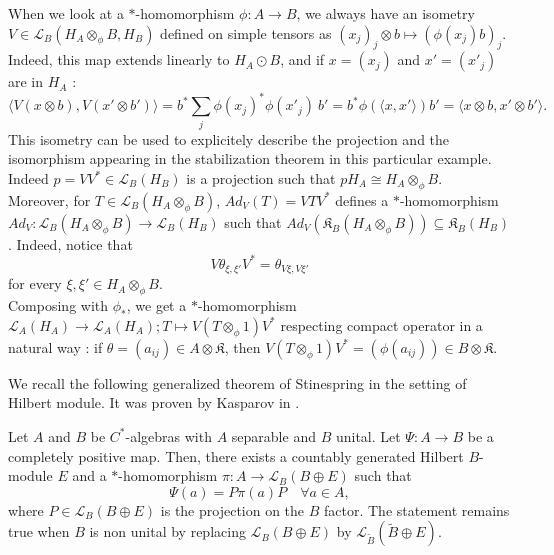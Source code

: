 \begin{rk}\label{isometry}
When we look at a $*$-homomorphism $\phi : A\rightarrow B$, we always have an isometry $V\in \mathcal L_B ( H_A\otimes_\phi B , H_B)$ defined on simple tensors as $(x_j)_j\otimes b \mapsto (\phi(x_j)b)_j$. Indeed, this map extends linearly to $H_A \odot B$, and if $x = (x_j)$ and $x'=(x'_j)$ are in $H_A$ : 
\[\langle V (x\otimes b) , V(x'\otimes b')\rangle = b^* \sum_j \phi(x_j)^* \phi(x'_j) \  b' = b^*\phi(\langle x, x' \rangle)b' = \langle x\otimes b , x'\otimes b' \rangle . \] %
This isometry can be used to explicitely describe the projection and the isomorphism appearing in the stabilization theorem in this particular example. Indeed $p = VV^*\in\mathcal L_B(H_B)$ is a projection such that $p H_A \cong H_A\otimes_\phi B $.\\

Moreover, for $T\in \mathcal L_B(H_A\otimes_\phi B)$, $Ad_V(T) = VTV^*$ defines a $*$-homomorphism $Ad_V : \mathcal L_B(H_A\otimes_\phi B)\rightarrow \mathcal L_B(H_B)$ such that $Ad_V(\mathfrak K_B(H_A\otimes_\phi B))\subseteq \mathfrak K_B(H_B)$. Indeed, notice that 
\[V\theta_{\xi,\xi'}V^* = \theta_{V\xi,V\xi'}\]
for every $\xi,\xi'\in H_A\otimes_\phi B$.\\

Composing with $\phi_*$, we get a $*$-homomorphism $\mathcal L_A(H_A)\rightarrow \mathcal L_A(H_A); T\mapsto V(T\otimes_\phi 1)V^*$ respecting compact operator in a natural way : if $\theta = (a_{ij})\in A\otimes\mathfrak K$, then $V(T\otimes_\phi 1)V^* = (\phi(a_{ij}))\in B\otimes\mathfrak K$.  
\end{rk}

We recall the following generalized theorem of Stinespring in the setting of Hilbert module. It was proven by Kasparov in \cite{KasparovStinespring}.

\begin{thm} \label{KasparovStinespring} Let $A$ and $B$ be $C^*$-algebras with $A$ separable and $B$ unital. Let $\Psi : A \rightarrow B$ be a completely positive map. Then, there exists a countably generated Hilbert $B$-module $E$ and a $*$-homomorphism $\pi : A \rightarrow \mathcal L_B (B\oplus E)$ such that
\[\Psi( a) = P \pi(a) P \quad \forall a\in A,\]
where $P\in\mathcal L_B(B\oplus E)$ is the projection on the $B$ factor. The statement remains true when $B$ is non unital by replacing $\mathcal L_B (B\oplus E)$ by $\mathcal L_{\tilde B} (\tilde{B}\oplus E)$.
\end{thm}
